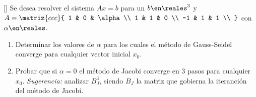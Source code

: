 \begin{enunciado}{\ejExtra}{\tiny[]}
  Se desea resolver el sistema $Ax = b$ para un $b \en \reales^3$ y
  $A = \matriz{ccc}{
      1 & 0 & \alpha \\
      1 & 1 & 0 \\
      -1 & 1 & 1 \\
    }$
  con $\alpha \en \reales$.
  \begin{enumerate}[label=(\alph*)]
    \item Determinar los valores de $\alpha$ para los cuales el método de Gauss-Seidel converge para cualquier vector inicial $x_0$.

    \item Probar que si $\alpha = 0$ el método de Jacobi converge en 3 pasos para cualquier $x_0$.
          \textit{Sugerencia:} analizar $B_J^3$, siendo $B_J$ la matriz que gobierna la iteranción del método de Jacobi.
  \end{enumerate}
\end{enunciado}

\hacer
